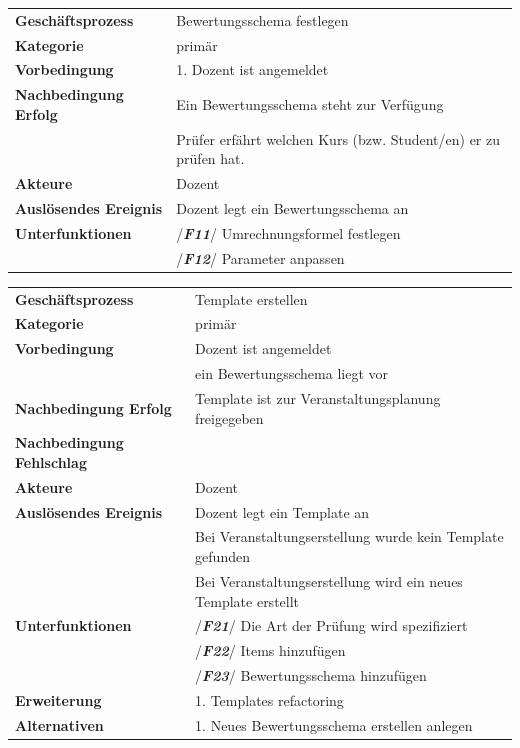 		\begin{table}[H]
			\begin{tabular}{|ll}
				\rowcolor{hellgrau}\multicolumn{2}{l}{/\textbf{\textit{F10}}/}\\\hline
				 \textbf{Geschäftsprozess} & Bewertungsschema festlegen \\ 
				 \textbf{Kategorie} & primär \\ 
				 \textbf{Vorbedingung} & 1. Dozent ist angemeldet  \\ 
				 \textbf{Nachbedingung Erfolg\phantom{xxxx}} & Ein Bewertungsschema steht zur Verfügung\\ 
				 & Prüfer erfährt welchen Kurs (bzw.  Student/en) er zu prüfen hat.\\
				 \textbf{Akteure} & Dozent \\ 
				 \textbf{Auslösendes Ereignis} & Dozent legt ein Bewertungsschema an  \\ 
				 \textbf{Unterfunktionen} & /\textbf{\textit{F11}}/ Umrechnungsformel festlegen\\
				 & /\textbf{\textit{F12}}/ Parameter anpassen
				 \end{tabular} 
			\label{tab:F10}
			\end{table}
	
		\begin{table}[H]
		\begin{tabular}{|ll}
			\rowcolor{hellgrau}\multicolumn{2}{l}{/\textbf{\textit{F20}}/}\\\hline
			 \textbf{Geschäftsprozess} & Template erstellen \\ 
			 \textbf{Kategorie} & primär \\ 
			 \textbf{Vorbedingung} & Dozent ist angemeldet\\
			 & ein Bewertungsschema liegt vor \\ 

			 \textbf{Nachbedingung Erfolg} & Template ist
			  zur Veranstaltungsplanung freigegeben  \\ 
			 \textbf{Nachbedingung Fehlschlag} &  \\ 
			 \textbf{Akteure} & Dozent \\ 
			 \textbf{Auslösendes Ereignis} & Dozent legt ein Template an \\
			 & Bei Veranstaltungserstellung wurde kein Template gefunden\\
			 & Bei Veranstaltungserstellung wird ein neues Template erstellt\\
			 \textbf{Unterfunktionen} & /\textbf{\textit{F21}}/ Die Art der Prüfung wird spezifiziert \\
			 &  /\textbf{\textit{F22}}/ Items hinzufügen\\
			 & /\textbf{\textit{F23}}/ Bewertungsschema hinzufügen\\
			  \textbf{Erweiterung} & 1. Templates refactoring \\ 
			 \textbf{Alternativen} & 1. Neues Bewertungsschema erstellen anlegen \\  			
			 \end{tabular} 
		\label{tab:F20}
		\end{table}
	
